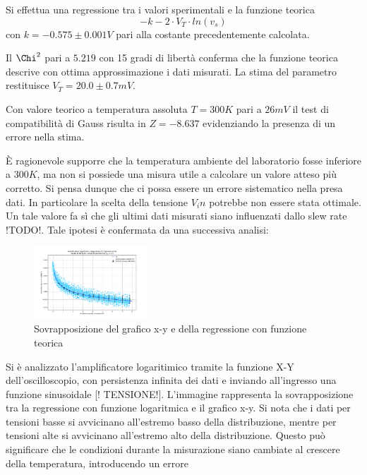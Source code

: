 \documentclass[journal]{IEEEtran}
\begin{document}
Si effettua una regressione tra i valori sperimentali e la funzione teorica 
\begin{equation}
-k - 2 \cdot V_T \cdot ln(v_s)
\end{equation}
con $k = -0.575 \pm 0.001 V$ pari alla costante precedentemente calcolata.

Il ${\Chi}^2$ pari a $5.219$ con 15 gradi di libertà conferma che la funzione teorica descrive con ottima approssimazione i dati misurati.
La stima del parametro restituisce $V_T = 20.0 \pm 0.7 mV$.

Con valore teorico a temperatura assoluta $T = 300K$ pari a $26 mV$ il test di compatibilità di Gauss risulta in $Z = -8.637$ evidenziando la presenza di un errore nella
stima.

È ragionevole supporre che la temperatura ambiente del laboratorio fosse inferiore a $300 K$, ma non si possiede una misura utile a calcolare un valore atteso più corretto.
Si pensa dunque che ci possa essere un errore sistematico nella presa dati. In particolare la scelta della tensione $V_in$ potrebbe non essere stata ottimale. Un tale valore
fa sì che gli ultimi dati misurati siano influenzati dallo slew rate !TODO!. Tale ipotesi è confermata da una successiva analisi:

\begin{figure}[H]%
\begin {center}
\includegraphics[width=0.38\textwidth]{analysis/output/OPA-log-fitted.pdf}
\caption{Sovrapposizione del grafico x-y e della regressione con funzione teorica}
\label{fig:oscilloscope}
\end {center}
\end{figure}

Si è analizzato l'amplificatore logaritimico tramite la funzione X-Y dell'oscilloscopio, con persistenza infinita dei dati e inviando all'ingresso una funzione sinusoidale [!
TENSIONE!]. L'immagine rappresenta la sovrapposizione tra la regressione con funzione logaritmica e il grafico x-y. Si nota che i dati per tensioni basse si avvicinano
all'estremo basso della distribuzione, mentre per tensioni alte si avvicinano all'estremo alto della distribuzione. Questo può significare che le condizioni durante la
misurazione siano cambiate al crescere della temperatura, introducendo un errore
\end{document}
